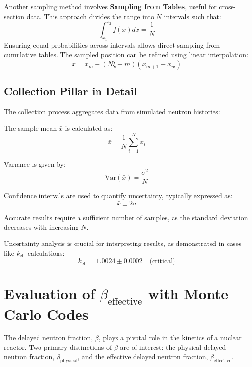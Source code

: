 Another sampling method involves \textbf{Sampling from Tables}, useful for cross-section data. This approach divides the range into $N$ intervals such that:
\begin{equation}
\int_{x_1}^{x_2} f(x) dx = \frac{1}{N}
\end{equation}
Ensuring equal probabilities across intervals allows direct sampling from cumulative tables. The sampled position can be refined using linear interpolation:
\begin{equation}
x = x_m + (N\xi - m)(x_{m+1} - x_m)
\end{equation}

\subsection{Collection Pillar in Detail}

The collection process aggregates data from simulated neutron histories:

The sample mean $\bar{x}$ is calculated as:
\begin{equation}
\bar{x} = \frac{1}{N} \sum_{i=1}^{N} x_i
\end{equation}

Variance is given by:
\begin{equation}
\text{Var}(\bar{x}) = \frac{\sigma^2}{N}
\end{equation}

Confidence intervals are used to quantify uncertainty, typically expressed as:
\begin{equation}
\bar{x} \pm 2\sigma
\end{equation}

Accurate results require a sufficient number of samples, as the standard deviation decreases with increasing $N$.

Uncertainty analysis is crucial for interpreting results, as demonstrated in cases like $k_{\text{eff}}$ calculations:
\begin{equation}
k_{\text{eff}} = 1.0024 \pm 0.0002 \quad \text{(critical)}
\end{equation}


\section{Evaluation of \texorpdfstring{$\beta_{\text{effective}}$}{Beta-effective} with Monte Carlo Codes}

The delayed neutron fraction, $\beta$, plays a pivotal role in the kinetics of a nuclear reactor. Two primary distinctions of $\beta$ are of interest: the physical delayed neutron fraction, $\beta_{\text{physical}}$, and the effective delayed neutron fraction, $\beta_{\text{effective}}$.

